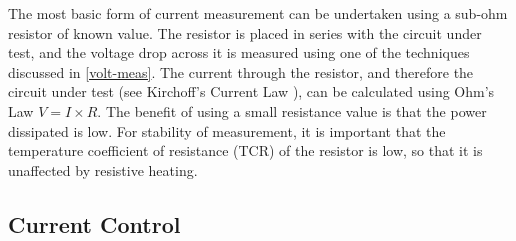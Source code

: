 The most basic form of current measurement can be undertaken using a sub-ohm resistor of known value. The resistor is placed in series with the circuit under test, and the voltage drop across it is measured using one of the techniques discussed in \ref{volt-meas}. The current through the resistor, and therefore the circuit under test (see Kirchoff's Current Law \cite{kirchoff}), can be calculated using Ohm's Law \cite{ohm} $V = I \times R$. The benefit of using a small resistance value is that the power dissipated is low. For stability of measurement, it is important that the temperature coefficient of resistance (TCR) of the resistor is low, so that it is unaffected by resistive heating. 


\subsection{Current Control}